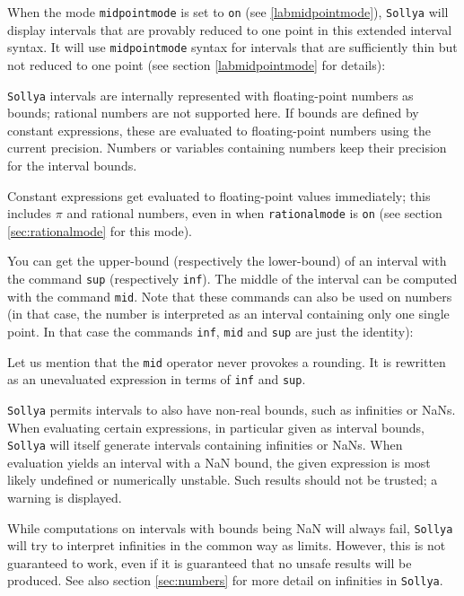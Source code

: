 \documentclass[a4paper]{article}
\newcommand{\com}[1]{\texttt{#1}}
\newcommand{\sollya}{\texttt{Sollya}\xspace}
\begin{document}


When the mode \com{midpointmode} is set to \com{on} (see
\ref{labmidpointmode}), \sollya will display intervals that are
provably reduced to one point in this extended interval syntax. It
will use \com{midpointmode} syntax for intervals that are sufficiently
thin but not reduced to one point (see section \ref{labmidpointmode}
for details):



\sollya intervals are internally represented with floating-point
numbers as bounds; rational numbers are not supported here. If bounds
are defined by constant expressions, these are evaluated to
floating-point numbers using the current precision. Numbers or
variables containing numbers keep their precision for the interval
bounds.

Constant expressions get evaluated to floating-point values
immediately; this includes $\pi$ and rational numbers, even in when
\com{rationalmode} is \com{on} (see section \ref{sec:rationalmode} for
this mode).



You can get the upper-bound (respectively the lower-bound) of an interval with the command \com{sup} (respectively \com{inf}). The middle of the interval can be computed with the command \com{mid}. Note that these commands can also be used on numbers (in that case, the number is interpreted as an interval containing only one single point. In that case the commands \com{inf}, \com{mid} and \com{sup} are just the identity):



Let us mention that the \com{mid} operator never provokes a
rounding. It is rewritten as an unevaluated expression in terms of
\com{inf} and \com{sup}.

\sollya permits intervals to also have non-real bounds, such as
infinities or NaNs. When evaluating certain expressions, in particular
given as interval bounds, \sollya will itself generate intervals
containing infinities or NaNs. When evaluation yields an interval with
a NaN bound, the given expression is most likely undefined or
numerically unstable. Such results should not be trusted; a warning is
displayed.

While computations on intervals with bounds being NaN will always
fail, \sollya will try to interpret infinities in the common way as
limits. However, this is not guaranteed to work, even if it is
guaranteed that no unsafe results will be produced. See also section
\ref{sec:numbers} for more detail on infinities in \sollya.
\end{document}
